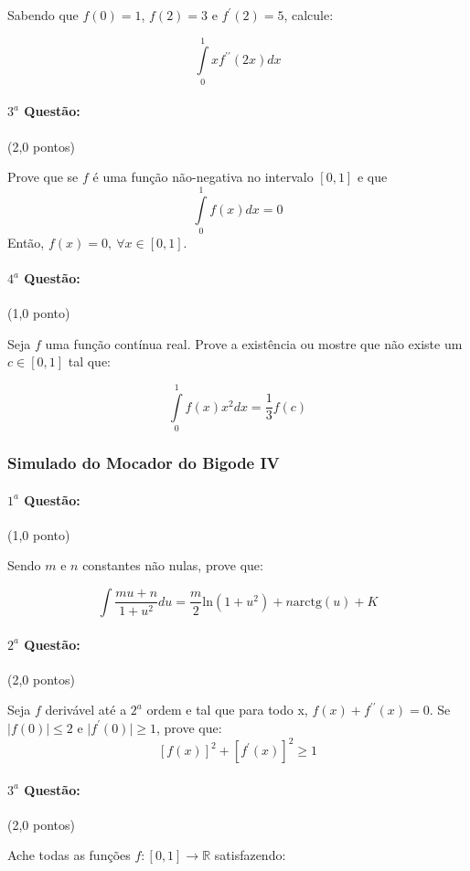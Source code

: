 \documentclass[12pt,a4paper]{article}
\newcommand{\modu}[1]{\vert #1 \vert}
\begin{document}
Sabendo que $f(0)=1$, $f(2)=3$ e $f^\prime(2)=5$, calcule:

$$\displaystyle\int\limits_0^1 x f^{\prime \prime}(2x) dx$$

\paragraph{$3^a$ Questão:} (2,0 pontos)

Prove que se $f$ é uma função não-negativa no intervalo $[0,1]$ e que 
$$ \displaystyle\int\limits_0^1 f(x)dx=0 $$
Então, $f(x)=0, \ \forall x \in [0,1]$.
\paragraph{$4^a$ Questão:} (1,0 ponto)

Seja $f$ uma função contínua real. Prove a existência ou mostre que não existe um $c \in [0,1]$ tal que:

$$\displaystyle\int\limits_0^1 f(x)x^2 dx = \dfrac{1}{3} f(c)$$

\newpage

\subsubsection{Simulado do Mocador do Bigode IV}

\paragraph{$1^a$ Questão:} (1,0 ponto)

Sendo $m$ e $n$ constantes não nulas, prove que:

$$ \displaystyle\int \dfrac{mu+n}{1+u^2}du = \dfrac{m}{2}\textrm{ln}(1+u^2) + n\textrm{arctg}(u) + K $$

\paragraph{$2^a$ Questão:} (2,0 pontos)

Seja $f$ derivável até a $2^a$ ordem e tal que para todo x, $f(x)+f^{\prime \prime}(x) = 0$. Se $\modu{f(0)}\leq 2$ e $\modu{f^\prime(0)}\geq 1$, prove que:
$$ [f(x)]^2+[f^\prime(x)]^2 \geq 1 $$

\paragraph{$3^a$ Questão:} (2,0 pontos)

Ache todas as funções $f:[0,1]\rightarrow \mathbb{R}$ satisfazendo:
\end{document}
